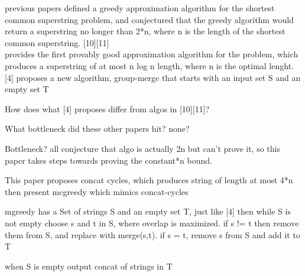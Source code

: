 \documentclass[letterpaper,twocolumn,11pt,titlepage]{article}
\begin{document}
previous papers defined a greedy approximation algorithm for the shortest common superstring
problem, and conjectured that the greedy algorithm would return a superstring no longer than 
2*n, where n is the length of the shortest common superstring.  [10][11]
\\
[4] provides the first provably good approximation algorithm for the problem, which produces
a superstring of at most n log n length, where n is the optimal lenght.
[4] proposes a new algorithm, group-merge that starts with
an input set S and an empty set T

How does what [4] proposes differ from algos in [10][11]?

What bottleneck did these other papers hit?
none?

Bottleneck?  all conjecture that algo is actually 2n but can't prove it, so this paper
takes steps towards proving the constant*n bound.

This paper proposes concat cycles, which produces string of length at most 4*n
then present mcgreedy which mimics concat-cycles

mgreedy has a Set of strings S and an empty set T, just like [4]
then while S is not empty choose s and t in S, where overlap is maximized.  if s != t
then remove them from S, and replace with merge(s,t).  if s = t, remove s from S and add it to T

when S is empty output concat of strings in T


{
  \small 
  
  
}
\end{document}
